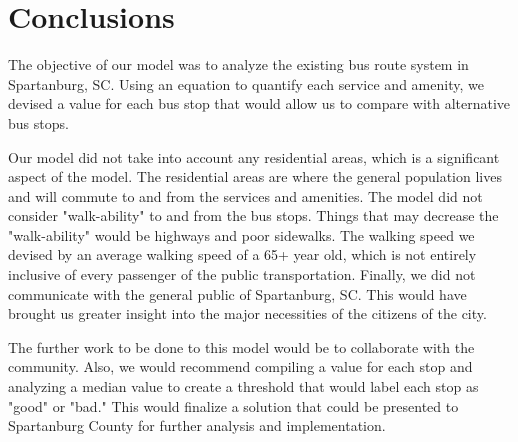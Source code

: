 \section{Conclusions}


The objective of our model was to analyze the existing bus route system in Spartanburg, SC. Using an equation to quantify each service and amenity, we devised a value for each bus stop that would allow us to compare with alternative bus stops. 

Our model did not take into account any residential areas, which is a significant aspect of the model. The residential areas are where the general population lives and will commute to and from the services and amenities. The model did not consider "walk-ability" to and from the bus stops. Things that may decrease the "walk-ability" would be highways and poor sidewalks. The walking speed we devised by an average walking speed of a 65+ year old, which is not entirely inclusive of every passenger of the public transportation. Finally, we did not communicate with the general public of Spartanburg, SC. This would have brought us greater insight into the major necessities of the citizens of the city. 

The further work to be done to this model would be to collaborate with the community. Also, we would recommend compiling a value for each stop and analyzing a median value to create a threshold that would label each stop as "good" or "bad." This would finalize a solution that could be presented to Spartanburg County for further analysis and implementation. 

